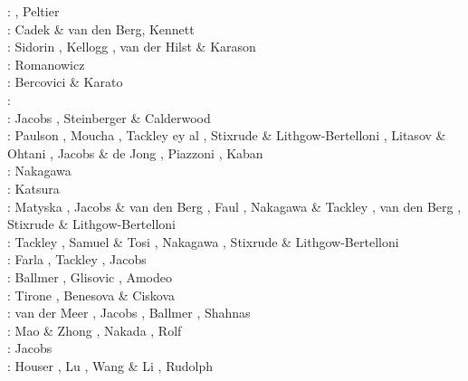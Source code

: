 \begin{scriptsize}
\nineteenninetyseven: \cite{mifo97}, Peltier \etal \cite{pebs97}\\
\nineteenninetyeight: Cadek \& van den Berg\cite{cava98}, Kennett \cite{kenn98}\\
\nineteenninetynine: Sidorin \etal \cite{sigh99}, Kellogg \etal \cite{kehv99}, 
                     van der Hilst \& Karason \cite{vaka99}\\
\twothousandone: Romanowicz \cite{roma01}\\
\twothousandthree: Bercovici \& Karato \cite{beka03} \\
\twothousandfive: \cite{hett05}\cite{nata05b}\cite{nabu05}\cite{stli05}\cite{stli05b}\\
\twothousandsix: Jacobs \etal \cite{javd06}, Steinberger \& Calderwood \cite{stca06}\\
\twothousandseven: Paulson \etal \cite{pazw07}, Moucha \etal \cite{mofm07}, 
                   Tackley ey al \cite{tanh07}, Stixrude \& Lithgow-Bertelloni \cite{stli07}, 
                   Litasov \& Ohtani \cite{lioh07}, Jacobs \& de Jong \cite{jade07},
                   Piazzoni \etal \cite{pisb07}, Kaban \etal \cite{kart07}\\
\twothousandnine: Nakagawa \etal \cite{natd09}\\
\twothousandten: Katsura \etal \cite{kayy10}\\
\twothousandeleven: Matyska \etal \cite{mayw11}, Jacobs \& van den Berg \cite{java11}, 
                    Faul \etal \cite{faff11}, Nakagawa \& Tackley \cite{nata11}, 
                    van den Berg \etal \cite{vayj11}, Stixrude \& Lithgow-Bertelloni \cite{stli11}\\
\twothousandtwelve: Tackley \cite{tack12}, Samuel \& Tosi \cite{sato12}, 
                    Nakagawa \etal \cite{natd12}, Stixrude \& Lithgow-Bertelloni \cite{stli12}\\
\twothousandthirteen: Farla \etal \cite{fakc13}, Tackley \etal \cite{taab13}, Jacobs \etal \cite{jasv13}\\
\twothousandfifteen: Ballmer \etal \cite{basn15}, Glisovic \etal \cite{glfa15}, Amodeo \etal \cite{amsb15}\\
\twothousandsixteen: Tirone \cite{tiro16}, Benesova \& Ciskova \cite{beci16}\\
\twothousandseventeen: van der Meer \etal \cite{vavs17}, Jacobs \etal \cite{jasv17}, 
                       Ballmer \etal \cite{bahh17}, Shahnas \etal \cite{shyp17,shpj17}\\
\twothousandeighteen: Mao \& Zhong \cite{mazh18}, Nakada \etal \cite{naoi18}, Rolf \etal \cite{roct18}\\
\twothousandnineteen: Jacobs \etal \cite{jasv19}\\
\twothousandtwenty: Houser \etal \cite{hohv20}, Lu \etal{} \cite{lufs20}, Wang \& Li \cite{wali20},
                    Rudolph \etal \cite{ruml20}
\end{scriptsize}


